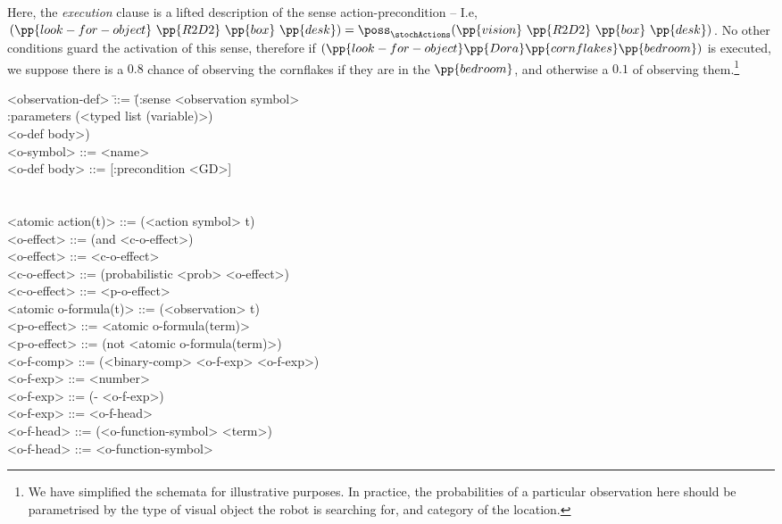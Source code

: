 \documentclass[letterpaper]{article}
\begin{document}
\noindent Here, the {\em execution} clause is a lifted description of
the sense action-precondition -- I.e,
$(\pp{look-for-object}~\pp{R2D2}~\pp{box}~\pp{desk}) =
\poss_\stochActions(\pp{vision}~\pp{R2D2}~\pp{box}~\pp{desk})$. No
other conditions guard the activation of this sense, therefore if
$(\pp{look-for-object} \pp{Dora} \pp{cornflakes} \pp{bedroom})$ is
executed, we suppose there is a $0.8$ chance of observing the
cornflakes if they are in the $\pp{bedroom}$, and otherwise a $0.1$ of
observing them.\footnote{We have simplified the schemata for
illustrative purposes. In practice, the probabilities of a particular
observation here should be parametrised by the type of visual object
the robot is searching for, and category of the location.}




\scriptsize
\begin{nopagebreak}\begin{tabtt}
<observation-def> \=::= \=(:sense <observation symbol> \\
                        \> \> :parameters (<typed list (variable)>)  \\
                        \> \> <o-def body>) \\
  <o-symbol> \> ::= <name> \\
  <o-def body> \> ::= [:precondition <GD>] \\
  \>  \\
    \>  \\
  <atomic action(t)> \> ::= (<action symbol> t\zom) \\
  <o-effect> \> ::= (and <c-o-effect>\zom) \\
  <o-effect> \> ::= <c-o-effect> \\
  <c-o-effect> \> ::=  (probabilistic <prob> <o-effect>) \\
  <c-o-effect> \> ::= <p-o-effect> \\
  <atomic o-formula(t)> \> ::= (<observation> t\zom) \\
  <p-o-effect> \> ::= <atomic o-formula(term)> \\
  <p-o-effect> \> ::= (not <atomic o-formula(term)>) \\
  <o-f-comp> \> ::= (<binary-comp> <o-f-exp> <o-f-exp>)\\
  <o-f-exp> \> ::= <number>\\
  <o-f-exp> \> ::= (- <o-f-exp>)\\
  <o-f-exp> \> ::= <o-f-head>\\
  <o-f-head> \> ::= (<o-function-symbol> <term>\zom )\\
  <o-f-head> \> ::= <o-function-symbol>\\
\end{tabtt}\end{nopagebreak}
\normalsize
\end{document}
